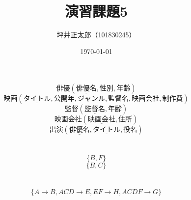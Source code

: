 \documentclass[a4paper,10pt]{jsarticle}
\begin{document}
\title{演習課題5}
\author{坪井正太郎（101830245）}
\date{\today}
\maketitle
\section{}
\[俳優(\underline{俳優名},性別,年齢)\]
\[映画(\underline{タイトル},公開年,ジャンル,監督名,映画会社,制作費)\]
\[監督(\underline{監督名},年齢)\]
\[映画会社(\underline{映画会社},住所)\]
\[出演(\underline{俳優名},\underline{タイトル},役名)\]

\section{}
\[\{B,F\}\]
\[\{B,C\}\]

\section{}
\[\{A\rightarrow B, ACD\rightarrow E, EF\rightarrow H, ACDF \rightarrow G\}\]
\end{document}
